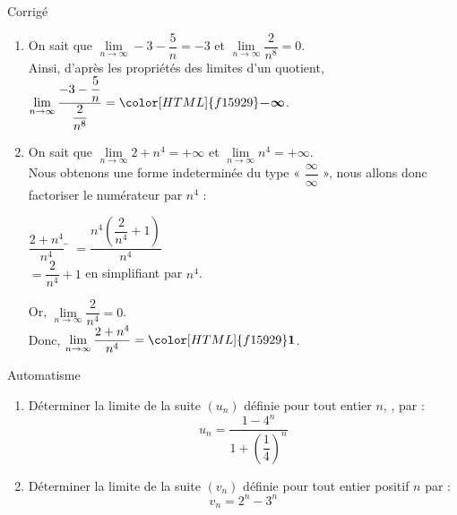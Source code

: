 \documentclass[a4paper,11pt,exos]{nsi} %
\newcounter{autNum}
\newcommand{\aut}[1]
{
	\addtocounter{autNum}{1}
	{\titlefont\color{UGLiBlue}\Large Automatisme\ \theautNum\ \normalsize{#1}}\smallskip	
}
\newcounter{corNum}
\newcommand{\cor}[1]
{
	\addtocounter{corNum}{1}
	{\titlefont\color{UGLiOrange}\Large Corrigé\ \thecorNum\ \normalsize{#1}}\smallskip	
}
\begin{document}
    \cor{}
    \begin{enumerate}[itemsep=1em]
        \item On sait que $\lim\limits_{n\to\infty} -3-\dfrac{5}{n}=-3$ et $\lim\limits_{n\to\infty} \dfrac{2}{n^8}=0$.\\Ainsi, d'après les propriétés des limites d'un quotient, $\lim\limits_{n\to\infty} \dfrac{-3-\dfrac{5}{n}}{\dfrac{2}{n^8}}={\color[HTML]{f15929}\boldsymbol{-\infty}}$.

        \item On sait que $\lim\limits_{n\to\infty} 2+n^4=+\infty$ et $\lim\limits_{n\to\infty} n^4=+\infty$.\\Nous obtenons une forme indeterminée du type « $\dfrac{\infty}{\infty}$ », nous allons donc factoriser le numérateur par $n^4$ :
        \begin{tabbing}
            $\dfrac{2+n^4}{n^4}$    \=  $=\dfrac{n^4(\dfrac{2}{n^4}+1)}{n^4}$\\[.5em]
            \>  $=\dfrac{2}{n^4}+1$ en simplifiant par $n^4$.
        \end{tabbing} 
        Or, $\lim\limits_{n\to\infty} \dfrac{2}{n^4}=0$.\\Donc, $\lim\limits_{n\to\infty} \dfrac{2+n^4}{n^4}={\color[HTML]{f15929}\boldsymbol{1}}$.

        \end{enumerate}

        

\aut{}
\begin{enumerate}
		\item Déterminer la limite de la suite $(u_n)$ définie pour tout entier $n$, , par : $$u_n=\dfrac{1-4^n}{1+\left(\dfrac{1}{4}\right)^n}$$
		\item Déterminer la limite de la suite $(v_n)$ définie pour tout entier positif $n$ par : $$v_n=2^n-3^n$$
\end{enumerate}
\end{document}
